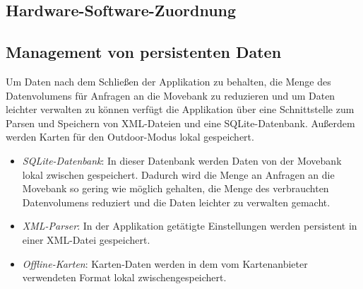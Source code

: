 \documentclass[12pt]{article} %
\begin{document}




\subsection{Hardware-Software-Zuordnung}
{\color{red}{Timo}}




\subsection{Management von persistenten Daten}

Um Daten nach dem Schließen der Applikation zu behalten, die Menge des Datenvolumens für Anfragen an die Movebank zu reduzieren und um Daten leichter verwalten zu können verfügt die Applikation über eine Schnittstelle zum Parsen und Speichern von XML-Dateien und eine SQLite-Datenbank. Außerdem werden Karten für den Outdoor-Modus lokal gespeichert.

\begin{itemize}
	\item \textit{SQLite-Datenbank}: In dieser Datenbank werden Daten von der Movebank lokal zwischen gespeichert. Dadurch wird die Menge an Anfragen an die Movebank so gering wie möglich gehalten, die Menge des verbrauchten Datenvolumens reduziert und die Daten leichter zu verwalten gemacht.
	
	\item \textit{XML-Parser}: In der Applikation getätigte Einstellungen werden persistent in einer XML-Datei gespeichert.
	
	\item \textit{Offline-Karten}: Karten-Daten werden in dem vom Kartenanbieter verwendeten Format lokal zwischengespeichert.
	
	
\end{itemize}
\end{document}
